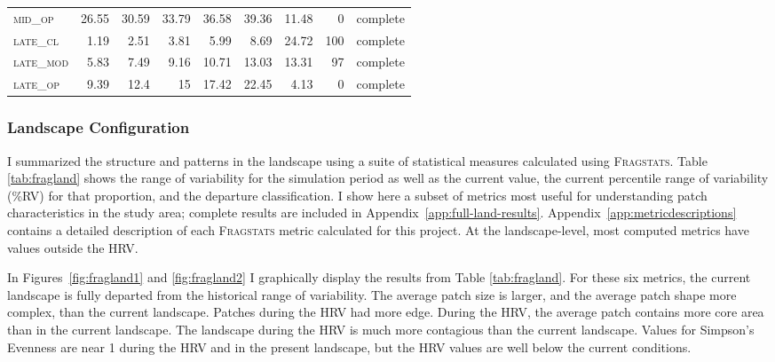 \begin{table}[!htbp]
\begin{tabular}{@{}lrrrrr|rrr@{}}
 \textsc{mid\_op   }      &  26.55         &  30.59    &  33.79    &  36.58    &  39.36     &  11.48       &   0      &  complete    \\
 \textsc{late\_cl  }      &  1.19          &  2.51     &  3.81     &  5.99     &  8.69      &  24.72       &   100    &  complete      \\
 \textsc{late\_mod }      &  5.83          &  7.49     &  9.16     &  10.71    &  13.03     &  13.31       &   97     &  complete     \\
 \textsc{late\_op  }      &  9.39          &  12.4     &  15       &  17.42    &  22.45     &  4.13        &   0      &   complete  \\ \bottomrule 
\end{tabular}
\end{table}

\clearpage



\subsubsection*{Landscape Configuration}
I summarized the structure and patterns in the landscape using a suite of statistical measures calculated using \textsc{Fragstats}. Table \ref{tab:fragland} shows the range of variability for the simulation period as well as the current value, the current percentile range of variability (\%RV) for that proportion, and the departure classification. I show here a subset of metrics most useful for understanding patch characteristics in the study area; complete results are included in Appendix~\ref{app:full-land-results}.  Appendix~\ref{app:metricdescriptions} contains a detailed description of each \textsc{Fragstats} metric calculated for this project. At the landscape-level, most computed metrics have values outside the HRV. 

In Figures~\ref{fig:fragland1} and \ref{fig:fragland2} I graphically display the results from Table \ref{tab:fragland}. For these six metrics, the current landscape is fully departed from the historical range of variability. The average patch size is larger, and the average patch shape more complex, than the current landscape. Patches during the HRV had more edge. During the HRV, the average patch contains more core area than in the current landscape. The landscape during the HRV is much more contagious than the current landscape. Values for Simpson's Evenness are near 1 during the HRV and in the present landscape, but the HRV values are well below the current conditions.

